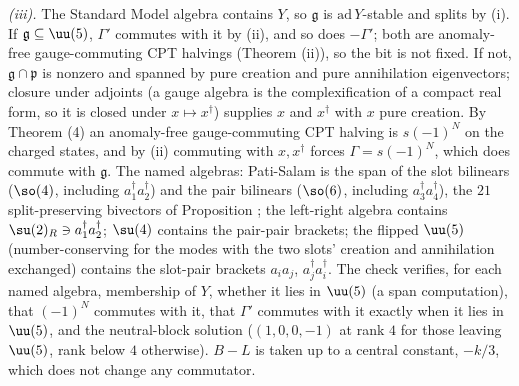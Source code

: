 \emph{(iii).} The Standard Model algebra contains $Y$, so $\mathfrak{g}$ is $\mathrm{ad}\,Y$-stable and splits by (i). If $\mathfrak{g} \subseteq \uu(5)$, $\Gamma'$ commutes with it by (ii), and so does $-\Gamma'$; both are anomaly-free gauge-commuting CPT halvings (Theorem (ii)), so the bit is not fixed. If not, $\mathfrak{g} \cap \mathfrak{p}$ is nonzero and spanned by pure creation and pure annihilation eigenvectors; closure under adjoints (a gauge algebra is the complexification of a compact real form, so it is closed under $x \mapsto x^{\dagger}$) supplies $x$ and $x^{\dagger}$ with $x$ pure creation. By Theorem (4) an anomaly-free gauge-commuting CPT halving is $s(-1)^{N}$ on the charged states, and by (ii) commuting with $x, x^{\dagger}$ forces $\Gamma = s(-1)^{N}$, which does commute with $\mathfrak{g}$. The named algebras: Pati-Salam is the span of the slot bilinears ($\so(4)$, including $a^{\dagger}_{1}a^{\dagger}_{2}$) and the pair bilinears ($\so(6)$, including $a^{\dagger}_{3}a^{\dagger}_{4}$), the $21$ split-preserving bivectors of Proposition ; the left-right algebra contains $\su(2)_{R} \ni a^{\dagger}_{1}a^{\dagger}_{2}$; $\su(4)$ contains the pair-pair brackets; the flipped $\uu(5)$ (number-conserving for the modes with the two slots' creation and annihilation exchanged) contains the slot-pair brackets $a_{i}a_{j}$, $a^{\dagger}_{j}a^{\dagger}_{i}$. The check verifies, for each named algebra, membership of $Y$, whether it lies in $\uu(5)$ (a span computation), that $(-1)^{N}$ commutes with it, that $\Gamma'$ commutes with it exactly when it lies in $\uu(5)$, and the neutral-block solution ($(1, 0, 0, -1)$ at rank $4$ for those leaving $\uu(5)$, rank below $4$ otherwise). $B - L$ is taken up to a central constant, $-k/3$, which does not change any commutator.

